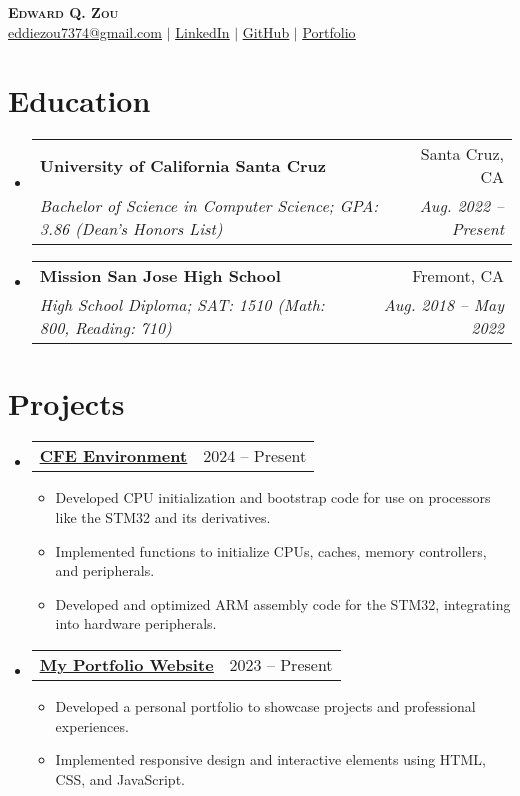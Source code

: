 \documentclass[letterpaper,11pt]{article}
\makeatletter
\newcommand{\resumeItem}[1]{
  \item\small{
    {#1 \vspace{-2pt}}
  }
}
\newcommand{\resumeSubheading}[4]{
  \vspace{-2pt}\item
    \begin{tabular*}{0.97\textwidth}[t]{l@{\extracolsep{\fill}}r}
      \textbf{#1} & #2 \\
      \textit{\small#3} & \textit{\small #4} \\
    \end{tabular*}\vspace{-7pt}
}
\newcommand{\resumeProjectHeading}[2]{
    \item
    \begin{tabular*}{0.97\textwidth}[t]{l@{\extracolsep{\fill}}r}
      \small#1 & #2 \\
    \end{tabular*}\vspace{-7pt}
}
\newcommand{\resumeSubHeadingListStart}{\begin{itemize}[leftmargin=0.15in, label={}]}
\newcommand{\resumeSubHeadingListEnd}{\end{itemize}}
\newcommand{\resumeItemListStart}{\begin{itemize}}
\newcommand{\resumeItemListEnd}{\end{itemize}\vspace{-5pt}}
\makeatother
\begin{document}
\begin{center}
    \textbf{\Huge \scshape Edward Q. Zou} \\ \vspace{1pt}
    \small \href{mailto:eddiezou7374@gmail.com}{\underline{eddiezou7374@gmail.com}} $|$ 
    \href{https://linkedin.com/in/edward-zou-13bb77182}{\underline{LinkedIn}} $|$
    \href{https://github.com/ezouu}{\underline{GitHub}} $|$
    \href{https://edwardportfolio-lyart.vercel.app/}{\underline{Portfolio}}
\end{center}

\section{Education}
  \resumeSubHeadingListStart
    \resumeSubheading
      {University of California Santa Cruz}{Santa Cruz, CA}
      {Bachelor of Science in Computer Science; GPA: 3.86 (Dean’s Honors List)}{Aug. 2022 -- Present}
    \resumeSubheading
      {Mission San Jose High School}{Fremont, CA}
      {High School Diploma; SAT: 1510 (Math: 800, Reading: 710)}{Aug. 2018 -- May 2022}
  \resumeSubHeadingListEnd

\section{Projects}
  \resumeSubHeadingListStart
    \resumeProjectHeading
      {\href{https://github.com/ezouu/cfe}{\underline{\textbf{CFE Environment}}}}{2024 -- Present}
      \resumeItemListStart
        \resumeItem{Developed CPU initialization and bootstrap code for use on processors like the STM32 and its derivatives.}
        \resumeItem{Implemented functions to initialize CPUs, caches, memory controllers, and peripherals.}
        \resumeItem{Developed and optimized ARM assembly code for the STM32, integrating into hardware peripherals.}
      \resumeItemListEnd
  \resumeSubHeadingListEnd

  \resumeSubHeadingListStart
    \resumeProjectHeading
      {\href{https://github.com/ezouu/ezouu.github.io}{\underline{\textbf{My Portfolio Website}}}}{2023 -- Present}
      \resumeItemListStart
        \resumeItem{Developed a personal portfolio to showcase projects and professional experiences.}
        \resumeItem{Implemented responsive design and interactive elements using HTML, CSS, and JavaScript.}
      \resumeItemListEnd
  \resumeSubHeadingListEnd
\end{document}
